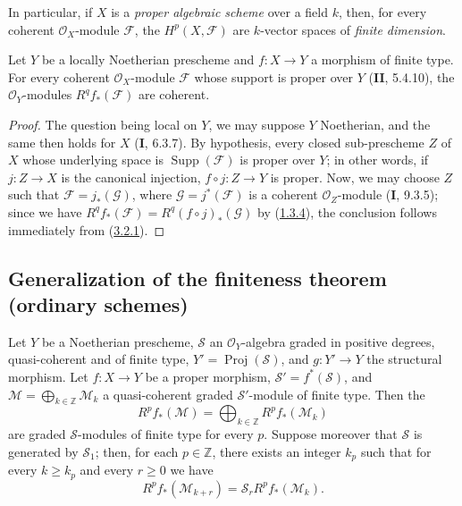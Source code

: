 In particular, if $X$ is a \emph{proper algebraic scheme} over a field
$k$, then, for every coherent $\mathcal O_X$-module $\mathcal F$, the
$H^p(X,\mathcal F)$ are $k$-vector spaces of \emph{finite
dimension}.

\begin{corollary}[3.2.4]
\label{III.3.2.4}
Let $Y$ be a locally Noetherian prescheme and $f:X\to Y$ a morphism of
finite type. For every coherent $\mathcal O_X$-module $\mathcal F$ whose
support is proper over $Y$ \textup{(\textbf{II}, 5.4.10)}, the $\mathcal O_Y$-modules
$R^qf_*(\mathcal F)$ are coherent.
\end{corollary}

\begin{proof}
The question being local on $Y$, we may suppose $Y$ Noetherian, and the
same then holds for $X$ (\textbf{I}, 6.3.7). By hypothesis, every closed sub-prescheme
$Z$ of $X$ whose underlying space is $\operatorname{Supp}(\mathcal F)$
is proper over $Y$; in other words, if $j:Z\to X$ is the canonical injection,
$f\circ j:Z\to Y$ is proper. Now, we may choose $Z$ such that
$\mathcal F=j_*(\mathcal G)$, where $\mathcal G=j^*(\mathcal F)$ is a
coherent $\mathcal O_Z$-module (\textbf{I}, 9.3.5); since we have
$R^qf_*(\mathcal F)=R^q(f\circ j)_*(\mathcal G)$ by
(\hyperref[III.1.3.4]{1.3.4}), the conclusion follows immediately from
(\hyperref[III.3.2.1]{3.2.1}).
\end{proof}

\subsection{Generalization of the finiteness theorem (ordinary schemes)}
\label{subsection:III.3.3}

\begin{proposition}[3.3.1]
\label{III.3.3.1}
Let $Y$ be a Noetherian prescheme, $\mathcal S$ an
$\mathcal O_Y$-algebra graded in positive degrees, quasi-coherent and of finite
type, $Y'=\operatorname{Proj}(\mathcal S)$, and $g:Y'\to Y$ the structural
morphism. Let $f:X\to Y$ be a proper morphism,
$\mathcal S'=f^*(\mathcal S)$, and
$\mathcal M=\bigoplus_{k\in\mathbb Z}\mathcal M_k$ a quasi-coherent graded
$\mathcal S'$-module of finite type. Then the
\[
R^pf_*(\mathcal M)=\bigoplus_{k\in\mathbb Z}R^pf_*(\mathcal M_k)
\]
are graded $\mathcal S$-modules of finite type for every $p$. Suppose
moreover that $\mathcal S$ is generated by $\mathcal S_1$; then, for
each $p\in\mathbb Z$, there exists an integer $k_p$ such that for every
$k\geq k_p$ and every $r\geq0$ we have
\[
R^pf_*(\mathcal M_{k+r})=\mathcal S_rR^pf_*(\mathcal M_k).
\tag{3.3.1.1}\label{III.3.3.1.1}
\]
\end{proposition}

